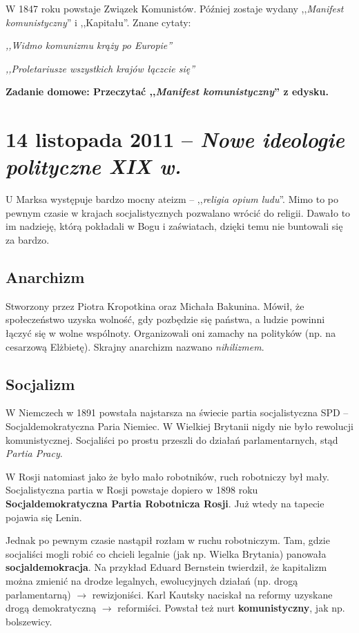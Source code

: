 \documentclass [a4paper, 11pt, oneside]{book}
\begin{document}
        W 1847 roku powstaje Związek Komunistów. Później zostaje wydany ,,\emph{Manifest komunistyczny}'' i ,,Kapitału''. Znane cytaty:
\begin{center}\emph{
        ,,Widmo komunizmu krąży po Europie''}


        \emph{,,Proletariusze wszystkich krajów łączcie się''}
        \end{center}
        \begin{flushright}
\textbf{Zadanie domowe: Przeczytać ,,\emph{Manifest komunistyczny}'' z edysku.}
        \end{flushright}
\chapter{14 listopada 2011 -- \textit{Nowe ideologie polityczne XIX w.}} %
\label{cha:14_listopada_2011_textit}
    U Marksa występuje bardzo mocny ateizm -- ,,\emph{religia opium ludu}''. Mimo to po pewnym czasie w krajach socjalistycznych pozwalano wrócić do religii. Dawało to im nadzieję, którą pokładali w Bogu i zaświatach, dzięki temu nie buntowali się za bardzo.
    \section{Anarchizm} %
    \label{sec:anarchizm}
        Stworzony przez Piotra Kropotkina oraz Michała Bakunina. Mówił, że społeczeństwo uzyska wolność, gdy pozbędzie się państwa, a ludzie powinni łączyć się w wolne wspólnoty. Organizowali oni zamachy na polityków (np. na cesarzową Elżbietę). Skrajny anarchizm nazwano \emph{nihilizmem}.
    \section{Socjalizm} %
    \label{sec:socjalizm}
        W Niemczech w 1891 powstała najstarsza na świecie partia socjalistyczna SPD -- Socjaldemokratyczna Paria Niemiec. W Wielkiej Brytanii nigdy nie było rewolucji komunistycznej. Socjaliści po prostu przeszli do działań parlamentarnych, stąd \emph{Partia Pracy}.

        W Rosji natomiast jako że było mało robotników, ruch robotniczy był mały. Socjalistyczna partia w Rosji powstaje dopiero w 1898 roku \textbf{Socjaldemokratyczna Partia Robotnicza Rosji}. Już wtedy na tapecie pojawia się Lenin.

        Jednak po pewnym czasie nastąpił rozłam w ruchu robotniczym. Tam, gdzie socjaliści mogli robić co chcieli legalnie (jak np. Wielka Brytania) panowała \textbf{socjaldemokracja}. Na przykład Eduard Bernstein twierdził, że kapitalizm można zmienić na drodze legalnych, ewolucyjnych działań (np. drogą parlamentarną) $\rightarrow$ rewizjoniści. Karl Kautsky naciskał na reformy uzyskane drogą demokratyczną $\rightarrow$ reformiści. Powstał też nurt \textbf{komunistyczny}, jak np. bolszewicy.
\end{document}
